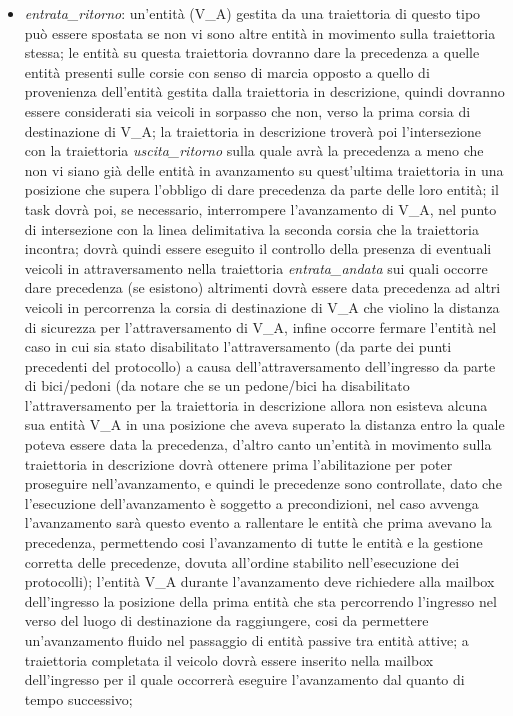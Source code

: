 \begin{enumerate}
\begin{itemize}
\item \textit{en\-tra\-ta\_ri\-tor\-no}: un'entità (V\_A) gestita da una traiettoria di questo tipo può essere spostata se non vi sono altre entità in movimento sulla traiettoria stessa; le entità su questa traiettoria dovranno dare la precedenza a quelle entità presenti sulle corsie con senso di marcia opposto a quello di provenienza dell'entità gestita dalla traiettoria in descrizione, quindi dovranno essere considerati sia veicoli in sorpasso che non, verso la prima corsia di destinazione di V\_A; la traiettoria in descrizione troverà poi l'intersezione con la traiettoria \textit{usci\-ta\_ri\-tor\-no} sulla quale avrà la precedenza a meno che non vi siano già delle entità in avanzamento su quest'ultima traiettoria in una posizione che supera l'obbligo di dare precedenza da parte delle loro entità; il task dovrà poi, se necessario, interrompere l'avanzamento di V\_A, nel punto di intersezione con la linea delimitativa la seconda corsia che la traiettoria incontra; dovrà quindi essere eseguito il controllo della presenza di eventuali veicoli in attraversamento nella traiettoria \textit{en\-tra\-ta\_an\-da\-ta} sui quali occorre dare precedenza (se esistono) altrimenti dovrà essere data precedenza ad altri veicoli in percorrenza la corsia di destinazione di V\_A che violino la distanza di sicurezza per l'attraversamento di V\_A, infine occorre fermare l'entità nel caso in cui sia stato disabilitato l'attraversamento (da parte dei punti precedenti del protocollo) a causa dell'attraversamento dell'ingresso da parte di bici/pedoni (da notare che se un pedone/bici ha disabilitato l'attraversamento per la traiettoria in descrizione allora non esisteva alcuna sua entità V\_A in una posizione che aveva superato la distanza entro la quale poteva essere data la precedenza, d'altro canto un'entità in movimento sulla traiettoria in descrizione dovrà ottenere prima l'abilitazione per poter proseguire nell'avanzamento, e quindi le precedenze sono controllate, dato che l'esecuzione dell'avanzamento è soggetto a precondizioni, nel caso avvenga l'avanzamento sarà questo evento a rallentare le entità che prima avevano la precedenza, permettendo cosi l'avanzamento di tutte le entità e la gestione corretta delle precedenze, dovuta all'ordine stabilito nell'esecuzione dei protocolli); l'entità V\_A durante l'avanzamento deve richiedere alla mailbox dell'ingresso la posizione della prima entità che sta percorrendo l'ingresso nel verso del luogo di destinazione da raggiungere, cosi da permettere un'avanzamento fluido nel passaggio di entità passive tra entità attive; a traiettoria completata il veicolo dovrà essere inserito nella mailbox dell'ingresso per il quale occorrerà eseguire l'avanzamento dal quanto di tempo successivo;

\end{itemize}
\end{enumerate}
